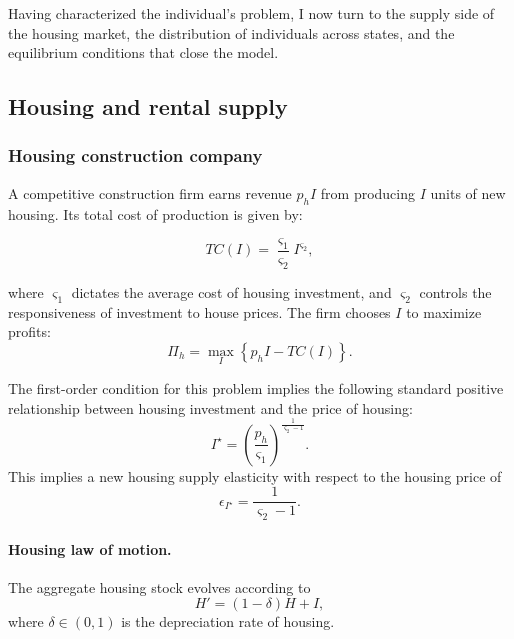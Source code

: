 \documentclass[parskip=full]{article}
\theoremstyle{plain}
\theoremstyle{definition}
\theoremstyle{remark}
\begin{document}
Having characterized the individual's problem, I now turn to the 
supply side of the housing market, the distribution of individuals 
across states, and the equilibrium conditions that close the model.

\subsection{Housing and rental supply}\label{sec:firms}

\subsubsection{Housing construction company}\label{sec:construction_company}

A competitive construction firm earns revenue $p_h I$ from producing $I$ units of new housing. Its total cost of production is given by:

\begin{equation*}\label{eq:total_cost_structure}
TC(I)=\frac{\varsigma_{1}}{\varsigma_{2}}I^{\varsigma_{2}},
\end{equation*}

\noindent where $\varsigma_{1}$ dictates the average cost of housing investment, and $\varsigma_{2}$ controls the responsiveness of investment to house prices. The firm chooses $I$ to maximize profits:
\begin{equation*}
\label{eq:construction_company_profits}
\Pi_h=\max_{I}\left\{p_h I-TC(I)\right\}.
\end{equation*}

The first-order condition for this problem implies the following standard positive relationship between housing investment and the price of housing:
\begin{equation}
\label{eq:construction_company_first_order_condition}
I^{\star}=\left(\frac{p_h}{\varsigma_{1}}\right)^{\frac{1}{\varsigma_{2}-1}}.
\end{equation}
This implies a new housing supply elasticity with respect to the housing price of
\begin{equation*}
\label{eq:elasticity_housing}
\epsilon_{I^{\star}}=\frac{1}{\varsigma_{2}-1}.
\end{equation*}

\paragraph{Housing law of motion.}
The aggregate housing stock evolves according to
\begin{equation}
\label{eq:housing_lom}
H'=(1-\delta)H+I,
\end{equation}
where $\delta\in(0,1)$ is the depreciation rate of housing.
\end{document}
